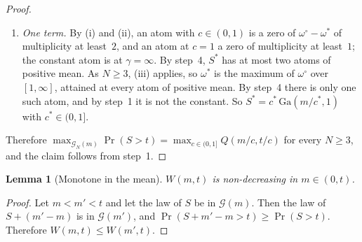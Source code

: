 \documentclass[11pt,a4paper]{article}
\theoremstyle{plain}
\newtheorem{lemma}[theorem]{Lemma}
\theoremstyle{definition}
\theoremstyle{remark}
\begin{document}
\begin{proof}
\begin{enumerate}
    The Laplace transform of a function with at most $n$ sign changes has at most $n$ zeros in $\gamma > 0$, counted with multiplicity: at a sign change~$u_1$, multiply the transform by $e^{\gamma u_1}$; its derivative in~$\gamma$ is the transform of a function with one sign change fewer; Rolle's theorem and induction conclude.
    So $\omega^\circ - \omega' = \gamma\int_0^\infty (h - \omega')\, e^{-\gamma u}\, \mathrm{d}u$ has at most two zeros in $\gamma > 0$.
    Also $\omega^\circ(\gamma) \to 0$ as $\gamma \to 0^+$.
    Hence $\omega^\circ$ cannot rise above a level $\omega' > 0$, fall below it and rise above it again: with $\omega^\circ(0^+) = 0$ that would give three zeros.
    So $\omega^\circ$ is quasi-concave.
    It is analytic in $\gamma > 0$ and not constant, so its maximum over $\gamma \in [1, \infty]$ is attained at one point only: two maximisers would make $\omega^\circ$ constant between them.
  \item \emph{One term.} By (i) and (ii), an atom with $c \in (0, 1)$ is a zero of $\omega^\circ - \omega^*$ of multiplicity at least~$2$, and an atom at $c = 1$ a zero of multiplicity at least~$1$; the constant atom is at $\gamma = \infty$.
    By step~4, $S^*$ has at most two atoms of positive mean.
    As $N \ge 3$, (iii) applies, so $\omega^*$ is the maximum of $\omega^\circ$ over $[1, \infty]$, attained at every atom of positive mean.
    By step~4 there is only one such atom, and by step~1 it is not the constant.
    So $S^* = c^*\,\mathrm{Ga}(m/c^*, 1)$ with $c^* \in (0, 1]$.
\end{enumerate}
Therefore $\max_{\mathcal{G}_N(m)} \Pr(S > t) = \max_{c \in (0,1]} Q(m/c, t/c)$ for every $N \ge 3$, and the claim follows from step~1.
\end{proof}

\begin{lemma}[Monotone in the mean]\label{lem:gamma_monotone}
$W(m, t)$ is non-decreasing in $m \in (0, t)$.
\end{lemma}
\begin{proof}
Let $m < m' < t$ and let the law of $S$ be in $\mathcal{G}(m)$.
Then the law of $S + (m' - m)$ is in $\mathcal{G}(m')$, and $\Pr(S + m' - m > t) \ge \Pr(S > t)$.
Therefore $W(m, t) \le W(m', t)$.
\end{proof}
\end{document}
